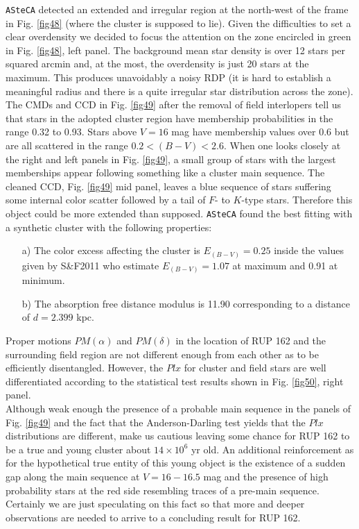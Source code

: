 \documentclass{aa}
\begin{document}
\texttt{ASteCA} detected an extended and irregular region at the north-west of
the frame in Fig. \ref{fig48} (where the cluster is supposed to lie). Given the
difficulties to set a clear overdensity we decided to focus the attention on the
zone encircled in green in Fig. \ref{fig48}, left panel. The background mean star
density is over 12 stars per squared arcmin and, at the most, the overdensity is
just 20 stars at the maximum. This produces unavoidably a noisy RDP (it is hard
to establish a meaningful radius and there is a quite irregular star
distribution across the zone).
The CMDs and CCD in Fig. \ref{fig49} after the removal of field interlopers tell
us that stars in the adopted cluster region have membership probabilities in the
range 0.32 to 0.93. Stars above $V=16$ mag have membership values over 0.6 but
are all scattered in the range $0.2<(B-V)<2.6$. When one looks closely at the
right and left panels in Fig. \ref{fig49}, a small group of stars with the
largest memberships appear following something like a cluster main sequence.
The cleaned CCD, Fig. \ref{fig49} mid panel, leaves a blue sequence of stars
suffering some internal color scatter followed by a tail of $F$- to $K$-type
stars. Therefore this object could be more extended than supposed. 
\texttt{ASteCA} found the best fitting with a synthetic cluster with the
following properties:

\begin{itemize}
\item [a)] The color excess affecting the cluster is $E_{(B-V)} = 0.25$ inside
    the values given by S\&F2011 who estimate $E_{(B-V)} = 1.07$ at
    maximum and 0.91 at minimum. 
\item [b)] The absorption free distance modulus is 11.90 corresponding to a
    distance of $d = 2.399$ kpc.
\end{itemize}

Proper motions $PM(\alpha)$ and $PM(\delta)$ in the location of RUP 162 and
the surrounding field region are not different enough from each other as to be
efficiently disentangled. However, the $Plx$ for cluster and field stars are
well differentiated according to the statistical test results shown in Fig.
\ref{fig50}, right panel.\\

Although weak enough the presence of a probable main sequence in the 
panels of Fig. \ref{fig49} and the fact that the Anderson-Darling test
yields that the $Plx$ distributions are different, make us cautious
leaving some chance for RUP 162 to be a true and young cluster about
$14\times10^6$ yr old. An additional reinforcement as for the hypothetical
true entity of this young object is the existence of a sudden gap along the
main sequence at $V = 16-16.5$ mag and the presence of high probability
stars at the red side resembling traces of a pre-main sequence. Certainly we
are just speculating on this fact so that more and deeper observations are
needed to arrive to a concluding result for RUP 162.
\end{document}
